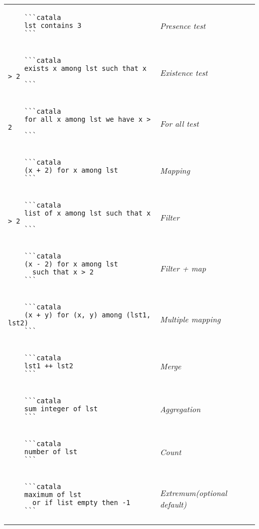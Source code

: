 \documentclass{article}
\makeatletter
\newenvironment{catala}{%
  \VerbatimEnvironment
  \let\FV@ListVSpace\relax
  \begin{verbatim}}%
 {\end{verbatim}}
\makeatother
\begin{document}
\begin{multicols}{3}
\begin{tabular}{@{}p{\cola}>{\slshape}p{\colb}@{}}
  \begin{catala}
    ```catala
    lst contains 3
    ```
  \end{catala}
  & Presence test
  \\
  \begin{catala}
    ```catala
    exists x among lst such that x > 2
    ```
  \end{catala}
  & Existence test
  \\
  \begin{catala}
    ```catala
    for all x among lst we have x > 2
    ```
  \end{catala}
  & For all test
  \\
  \begin{catala}
    ```catala
    (x + 2) for x among lst
    ```
  \end{catala}
  & Mapping
  \\
  \begin{catala}
    ```catala
    list of x among lst such that x > 2
    ```
  \end{catala}
  & Filter
  \\
  \begin{catala}
    ```catala
    (x - 2) for x among lst
      such that x > 2
    ```
  \end{catala}
  & Filter + map
  \\
  \begin{catala}
    ```catala
    (x + y) for (x, y) among (lst1, lst2)
    ```
  \end{catala}
  & Multiple mapping
  \\
  \begin{catala}
    ```catala
    lst1 ++ lst2
    ```
  \end{catala}
  & Merge
  \\
  \begin{catala}
    ```catala
    sum integer of lst
    ```
  \end{catala}
  & Aggregation
  \\
  \begin{catala}
    ```catala
    number of lst
    ```
  \end{catala}
  & Count
  \\
  \begin{catala}
    ```catala
    maximum of lst
      or if list empty then -1
    ```
  \end{catala}
  & Extremum\newline (optional default)

\end{tabular}
\end{multicols}
\end{document}
